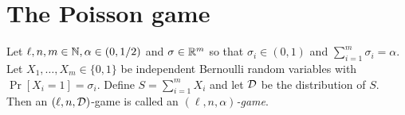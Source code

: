 
\section{The Poisson game}
  \begin{definition}\label{def:xor-game-poisson}
      Let $\ell, n, m \in \mathbb{N}, \alpha \in (0, 1/2)$ and 
      $\sigma \in \mathbb{R}^m$ so that $\sigma_i \in (0, 1)$ and $\sum_{i=1}^m \sigma_i = \alpha$. 
      Let $X_1, \ldots, X_m \in \{0,1\}$ be independent Bernoulli random variables with 
      $\Pr[X_i = 1] = \sigma_i$. 
      Define $S = \sum_{i = 1}^m X_i$ 
      and let $\mathcal{D}$ be the distribution of $S$.
      Then an $(\ell, n, \mathcal{D})$-game is called an 
      \emph{$(\ell, n, \alpha)$-game}.
  \end{definition}


